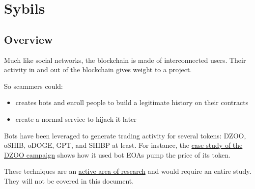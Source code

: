 \section{Sybils} \label{sec:sybils}

\subsection{Overview}

Much like social networks, the blockchain is made of interconnected users.
Their activity in and out of the blockchain gives weight to a project.

So scammers could:

\begin{itemize}
\item{creates bots and enroll people to build a legitimate history on their contracts}
\item{create a normal service to hijack it later}
\end{itemize}

Bots have been leveraged to generate trading activity for several tokens: DZOO, oSHIB, oDOGE, GPT, and SHIBP at least.
For instance, the \href{\urlarticlesoftrugpull}{case study of the DZOO campaign} shows how it used bot EOAs pump the price of its token.

These techniques are an \href{\urlarticlesybilattack}{active area of research} and would require an entire study.
They will not be covered in this document.
